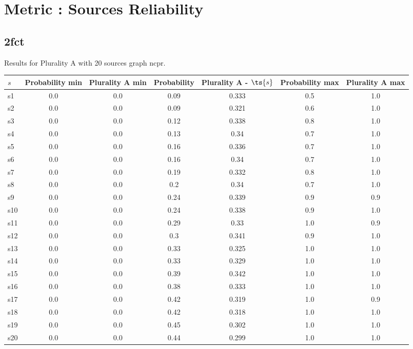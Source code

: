 \documentclass{article}
\begin{document}
\section{Metric : Sources Reliability}

\newpage
\newpage

\subsection{2fct}

\noindent Results for Plurality A with 20 sources graph ncpr.

\noindent\begin{tabular}{|l|c|c|c|c|c|c|}
\hline
$s$& Probability min & Plurality A min & Probability & Plurality A - $\ts{s}$ & Probability max & Plurality A max\\
\hline
s1 &0.0 & 0.0 & 0.09 & 0.333 & 0.5 & 1.0\\
\hline
s2 &0.0 & 0.0 & 0.09 & 0.321 & 0.6 & 1.0\\
\hline
s3 &0.0 & 0.0 & 0.12 & 0.338 & 0.8 & 1.0\\
\hline
s4 &0.0 & 0.0 & 0.13 & 0.34 & 0.7 & 1.0\\
\hline
s5 &0.0 & 0.0 & 0.16 & 0.336 & 0.7 & 1.0\\
\hline
s6 &0.0 & 0.0 & 0.16 & 0.34 & 0.7 & 1.0\\
\hline
s7 &0.0 & 0.0 & 0.19 & 0.332 & 0.8 & 1.0\\
\hline
s8 &0.0 & 0.0 & 0.2 & 0.34 & 0.7 & 1.0\\
\hline
s9 &0.0 & 0.0 & 0.24 & 0.339 & 0.9 & 0.9\\
\hline
s10 &0.0 & 0.0 & 0.24 & 0.338 & 0.9 & 1.0\\
\hline
s11 &0.0 & 0.0 & 0.29 & 0.33 & 1.0 & 0.9\\
\hline
s12 &0.0 & 0.0 & 0.3 & 0.341 & 0.9 & 1.0\\
\hline
s13 &0.0 & 0.0 & 0.33 & 0.325 & 1.0 & 1.0\\
\hline
s14 &0.0 & 0.0 & 0.33 & 0.329 & 1.0 & 1.0\\
\hline
s15 &0.0 & 0.0 & 0.39 & 0.342 & 1.0 & 1.0\\
\hline
s16 &0.0 & 0.0 & 0.38 & 0.333 & 1.0 & 1.0\\
\hline
s17 &0.0 & 0.0 & 0.42 & 0.319 & 1.0 & 0.9\\
\hline
s18 &0.0 & 0.0 & 0.42 & 0.318 & 1.0 & 1.0\\
\hline
s19 &0.0 & 0.0 & 0.45 & 0.302 & 1.0 & 1.0\\
\hline
s20 &0.0 & 0.0 & 0.44 & 0.299 & 1.0 & 1.0\\
\hline
\end{tabular}\\
\end{document}
